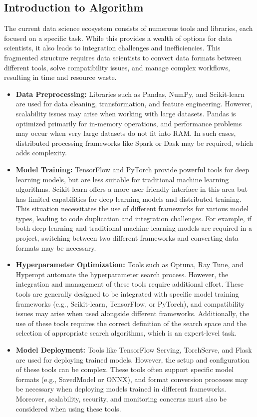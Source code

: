 \documentclass[conference]{IEEEtran}
\begin{document}
\subsection{Introduction to Algorithm}

The current data science ecosystem consists of numerous tools and libraries, each focused on a specific task. While this provides a wealth of options for data scientists, it also leads to integration challenges and inefficiencies. This fragmented structure requires data scientists to convert data formats between different tools, solve compatibility issues, and manage complex workflows, resulting in time and resource waste. 

\begin{itemize}
    \item \textbf{Data Preprocessing:} Libraries such as Pandas, NumPy, and Scikit-learn are used for data cleaning, transformation, and feature engineering. However, scalability issues may arise when working with large datasets. Pandas is optimized primarily for in-memory operations, and performance problems may occur when very large datasets do not fit into RAM. In such cases, distributed processing frameworks like Spark or Dask may be required, which adds complexity.
    
    \item \textbf{Model Training:} TensorFlow and PyTorch provide powerful tools for deep learning models, but are less suitable for traditional machine learning algorithms. Scikit-learn offers a more user-friendly interface in this area but has limited capabilities for deep learning models and distributed training. This situation necessitates the use of different frameworks for various model types, leading to code duplication and integration challenges. For example, if both deep learning and traditional machine learning models are required in a project, switching between two different frameworks and converting data formats may be necessary.
    
    \item \textbf{Hyperparameter Optimization:} Tools such as Optuna, Ray Tune, and Hyperopt automate the hyperparameter search process. However, the integration and management of these tools require additional effort. These tools are generally designed to be integrated with specific model training frameworks (e.g., Scikit-learn, TensorFlow, or PyTorch), and compatibility issues may arise when used alongside different frameworks. Additionally, the use of these tools requires the correct definition of the search space and the selection of appropriate search algorithms, which is an expert-level task.
    
    \item \textbf{Model Deployment:} Tools like TensorFlow Serving, TorchServe, and Flask are used for deploying trained models. However, the setup and configuration of these tools can be complex. These tools often support specific model formats (e.g., SavedModel or ONNX), and format conversion processes may be necessary when deploying models trained in different frameworks. Moreover, scalability, security, and monitoring concerns must also be considered when using these tools.
\end{itemize}
\end{document}
